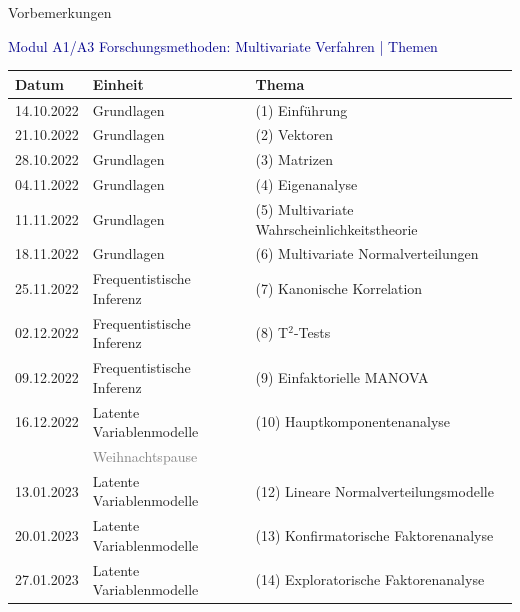 \documentclass[
  8pt,
  ignorenonframetext,
]{beamer}
\begin{document}
\begin{frame}{Vorbemerkungen}
\protect\hypertarget{vorbemerkungen}{}
\vspace{2mm}

\textcolor{darkblue}{Modul A1/A3 Forschungsmethoden: Multivariate Verfahren | Themen}
\vspace{2mm}

\center
\footnotesize
\renewcommand{\arraystretch}{1.1}
\begin{tabular}{lll}
Datum        & Einheit                          & Thema                                               \\\hline
14.10.2022   & Grundlagen                       & (1) Einführung                                      \\
21.10.2022   & Grundlagen                       & (2) Vektoren                                \\
28.10.2022   & Grundlagen                       & (3) Matrizen                                \\
04.11.2022   & Grundlagen                       & (4) Eigenanalyse                            \\
11.11.2022   & Grundlagen                       & (5) Multivariate Wahrscheinlichkeitstheorie \\
18.11.2022   & Grundlagen                       & (6) Multivariate Normalverteilungen         \\
25.11.2022   & Frequentistische Inferenz        & (7) Kanonische Korrelation                  \\
02.12.2022   & Frequentistische Inferenz        & (8) T$^2$-Tests                             \\
09.12.2022   & Frequentistische Inferenz        & (9) Einfaktorielle MANOVA                   \\
16.12.2022   & Latente Variablenmodelle         & (10) Hauptkomponentenanalyse                \\
             & \textcolor{gray}{Weihnachtspause}                                              \\
13.01.2023   & Latente Variablenmodelle         & (12) Lineare Normalverteilungsmodelle       \\
20.01.2023   & Latente Variablenmodelle         & (13) Konfirmatorische Faktorenanalyse       \\
27.01.2023   & Latente Variablenmodelle         & (14) Exploratorische Faktorenanalyse        \\\hline
\end{tabular}
\end{frame}
\end{document}
